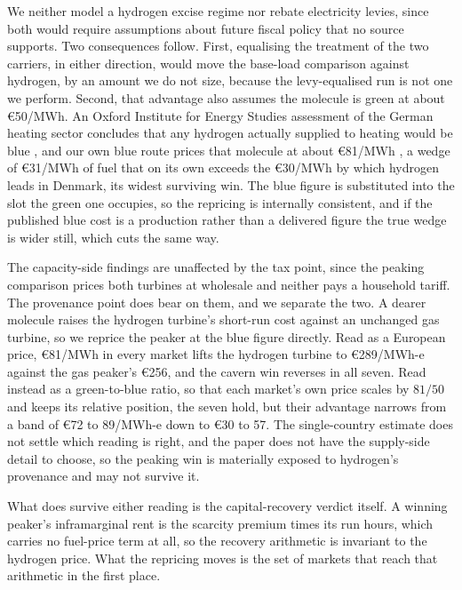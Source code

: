 We neither model a hydrogen excise regime nor rebate electricity levies, since both would
require assumptions about future fiscal policy that no source supports. Two
consequences follow. First, equalising the treatment of the two carriers, in either
direction, would move the base-load comparison against hydrogen, by an amount we do not
size, because the levy-equalised run is not one we perform. Second, that
advantage also assumes the molecule is green at about \euro{}50/MWh. An Oxford Institute for Energy Studies assessment of the German heating sector concludes that any hydrogen actually supplied to heating would be blue \citep{Dickel2024ET29}, and our own blue route prices that molecule at about \euro{}81/MWh \citep{IEAGHG2022blue}, a wedge of \euro{}31/MWh of fuel that on its own exceeds the
\euro{}30/MWh by which hydrogen leads in Denmark, its widest surviving win. The blue
figure is substituted into the slot the green one occupies, so the repricing is internally
consistent, and if the published blue cost is a production rather than a delivered figure
the true wedge is wider still, which cuts the same way.

The capacity-side findings are unaffected by the tax point, since the peaking comparison
prices both turbines at wholesale and neither pays a household tariff. The provenance point does bear on them, and we separate the two. A dearer molecule raises the hydrogen turbine's short-run cost against an
unchanged gas turbine, so we reprice the peaker at the blue figure directly. Read as a
European price, \euro{}81/MWh in every market lifts the hydrogen turbine to
\euro{}289/MWh-e against the gas peaker's \euro{}256, and the cavern win reverses in all
seven. Read instead as a green-to-blue ratio, so that each market's own price scales
by $81/50$ and keeps its relative position, the seven hold, but their advantage narrows from a band of \euro{}72 to 89/MWh-e down to \euro{}30 to 57. The single-country estimate does not settle
which reading is right, and the paper does not have the supply-side detail to choose, so
the peaking win is materially exposed to hydrogen's
provenance and may not survive it.

What does survive either reading is the capital-recovery verdict itself. A winning
peaker's inframarginal rent is the scarcity premium times its run hours, which carries no
fuel-price term at all, so the recovery arithmetic is invariant to the hydrogen price. What
the repricing moves is the set of markets that reach that arithmetic in the first place.

